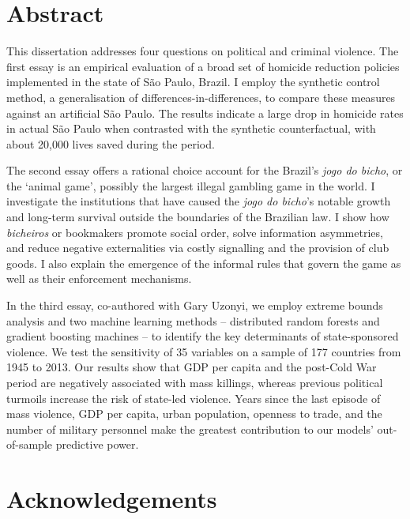 \documentclass[a4paper,12pt]{report}
\newcommand{\linespacing}{2}
\renewcommand{\baselinestretch}{\linespacing}
\begin{document}
\chapter*{Abstract}
\renewcommand{\baselinestretch}{\linespacing}
\small\normalsize

This dissertation addresses four questions on political and criminal violence. The first essay is an empirical evaluation of a broad set of homicide reduction policies implemented in the state of São Paulo, Brazil. I employ the synthetic control method, a generalisation of differences-in-differences, to compare these measures against an artificial São Paulo. The results indicate a large drop in homicide rates in actual São Paulo when contrasted with the synthetic counterfactual, with about 20,000 lives saved during the period. 

The second essay offers a rational choice account for the Brazil's \textit{jogo do bicho}, or the `animal game', possibly the largest illegal gambling game in the world. I investigate the institutions that have caused the \textit{jogo do bicho}'s notable growth and long-term survival outside the boundaries of the Brazilian law. I show how \textit{bicheiros} or bookmakers promote social order, solve information asymmetries, and reduce negative externalities via costly signalling and the provision of club goods. I also explain the emergence of the informal rules that govern the game as well as their enforcement mechanisms. 

In the third essay, co-authored with Gary Uzonyi, we employ extreme bounds analysis and two machine learning methods -- distributed random forests and gradient boosting machines -- to identify the key determinants of state-sponsored violence. We test the sensitivity of 35 variables on a sample of 177 countries from 1945 to 2013. Our results show that GDP per capita and the post-Cold War period are negatively associated with mass killings, whereas previous political turmoils increase the risk of state-led violence. Years since the last episode of mass violence, GDP per capita, urban population, openness to trade, and the number of military personnel make the greatest contribution to our models' out-of-sample predictive power.



\chapter*{Acknowledgements}
\renewcommand{\baselinestretch}{\linespacing}
\small\normalsize
\end{document}
